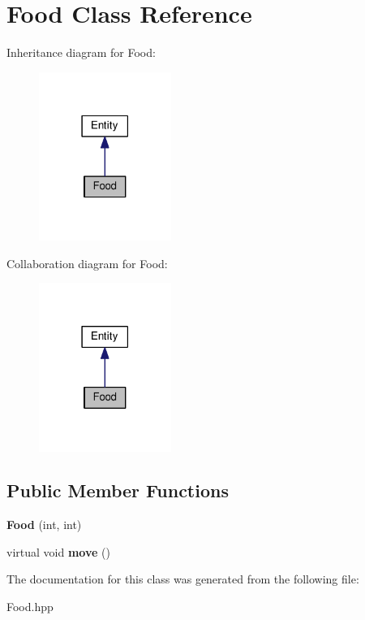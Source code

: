 \hypertarget{classFood}{}\section{Food Class Reference}
\label{classFood}


Inheritance diagram for Food\+:
\nopagebreak
\begin{figure}[H]
\begin{center}
\leavevmode
\includegraphics[width=122pt]{classFood__inherit__graph}
\end{center}
\end{figure}


Collaboration diagram for Food\+:
\nopagebreak
\begin{figure}[H]
\begin{center}
\leavevmode
\includegraphics[width=122pt]{classFood__coll__graph}
\end{center}
\end{figure}
\subsection*{Public Member Functions}
\begin{DoxyCompactItemize}
\item 
\mbox{\label{classFood_a342b2d30bd73b66d511aebd99ea3d0f9}} 
{\bfseries Food} (int, int)
\item 
\mbox{\label{classFood_a8ab7250367a71b56cd52df3eb2eb0586}} 
virtual void {\bfseries move} ()
\end{DoxyCompactItemize}


The documentation for this class was generated from the following file\+:\begin{DoxyCompactItemize}
\item 
Food.\+hpp\end{DoxyCompactItemize}
